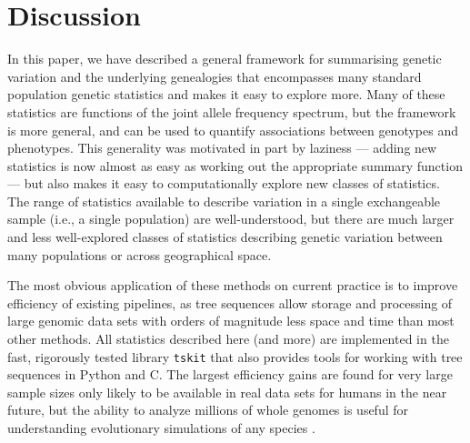 \documentclass{article}
\newcommand{\tskit}{{\texttt{tskit}}}
\begin{document}
\section*{Discussion}

In this paper, we have described a general framework for summarising genetic variation
and the underlying genealogies
that encompasses many standard population genetic statistics
and makes it easy to explore more.
Many of these statistics are functions of the joint allele frequency spectrum,
but the framework is more general,
and can be used to quantify associations between genotypes and phenotypes.
This generality was motivated in part by laziness ---
adding new statistics is now almost as easy as working out the appropriate summary function ---
but also makes it easy to computationally explore new classes of statistics.
The range of statistics available to describe variation in a single exchangeable sample
(i.e., a single population) are well-understood,
but there are much larger and less well-explored classes of statistics
describing genetic variation between many populations
or across geographical space.

The most obvious application of these methods on current practice
is to improve efficiency of existing pipelines,
as tree sequences allow storage and processing of large genomic data sets
with orders of magnitude less space and time than most other methods.
All statistics described here (and more) are implemented
in the fast, rigorously tested library \tskit{}
that also provides tools for working with tree sequences in Python and C.
The largest efficiency gains are found for very large sample sizes
only likely to be available in real data sets for humans in the near future,
but the ability to analyze millions of whole genomes
is useful for understanding evolutionary simulations of any species
\citep[see][for a recent example]{galloway2019stickleback}.
\end{document}
